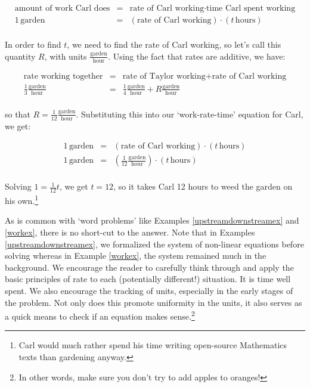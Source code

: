 \documentclass{ximera}
\begin{document}
\begin{example}
\begin{explanation}
\[ \begin{array}{rcl}

\text{amount of work Carl does} & = & \text{rate of Carl working} \cdot \text{time Carl spent working} \\

1 \, \text{garden} & = & (\text{rate of Carl working}) \cdot (t \, \text{hours}) \\ \end{array} \]

In order to find $t$, we need to find the rate of Carl working, so let's call this quantity $R$, with units $\frac{\text{garden}}{\text{hour}}$.  Using the fact that rates are additive, we have:

\[ \begin{array}{rcl}

\text{rate working together} & = & \text{rate of Taylor working} + \text{rate of Carl working} \\ [5pt]

\frac{1}{3} \frac{\text{garden}}{\text{hour}} & = & \frac{1}{4} \frac{\text{garden}}{\text{hour}} + R \frac{\text{garden}}{\text{hour}} \\ \end{array} \]

so that $R = \frac{1}{12} \frac{\text{garden}}{\text{hour}}$.  Substituting this into our `work-rate-time' equation for Carl, we get:

\[ \begin{array}{rcl}

1 \, \text{garden} & = & (\text{rate of Carl working}) \cdot (t \, \text{hours}) \\ [5pt] 

1 \, \text{garden} & = & \left(\frac{1}{12} \frac{\text{garden}}{\text{hour}} \right) \cdot (t \, \text{hours}) \\ \end{array} \]

Solving $1 = \frac{1}{12} t$, we get $t = 12$, so it takes Carl 12 hours to weed the garden on his own.\footnote{Carl would much rather spend his time writing open-source Mathematics texts than gardening anyway.} 
\end{explanation}
\end{example}

As is common with `word problems' like Examples \ref{upstreamdownstreamex} and \ref{workex}, there is no short-cut to the answer.  Note that in  Examples \ref{upstreamdownstreamex}, we formalized the system of non-linear equations before solving whereas in Example \ref{workex}, the system remained much in the background.  We encourage the reader to carefully think through and apply the basic principles of rate to each (potentially different!) situation.  It is time well spent.  We also encourage the tracking of units, especially in the early stages of the problem.  Not only does this promote uniformity in the units, it also serves as a quick means to check if an equation makes sense.\footnote{In other words, make sure you don't try to add apples to oranges!}


\closegraphsfile
\end{document}
